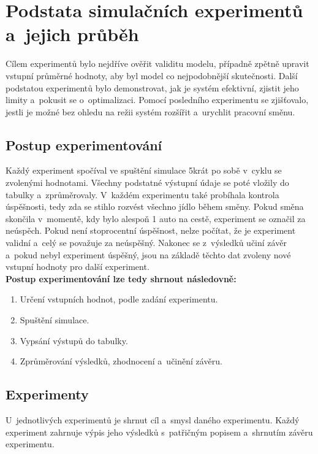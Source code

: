 \documentclass[a4paper, 11pt]{article}
\begin{document}
	\section{Podstata simulačních experimentů a~jejich průběh}

	Cílem experimentů bylo nejdříve ověřit validitu modelu, případně zpětně
	upravit vstupní průměrné hodnoty, aby byl model co nejpodobnější
	skutečnosti. Další podstatou experimentů bylo demonstrovat, jak je
	systém efektivní, zjistit jeho limity a~pokusit se o~optimalizaci.
	Pomocí posledního experimentu se zjišťovalo, jestli je možné bez ohledu
	na režii systém rozšířit a~urychlit pracovní směnu.


	\subsection{Postup experimentování}

	Každý experiment spočíval ve spuštění simulace 5krát po sobě v~cyklu se
	zvolenými hodnotami. Všechny podstatné výstupní údaje se poté vložily do
	tabulky a~zprůměrovaly. V~každém experimentu také probíhala kontrola
	úspěšnosti, tedy zda se stihlo rozvést všechno jídlo během směny. Pokud
	směna skončila v~momentě, kdy bylo alespoň 1 auto na cestě, experiment se
	označil za neúspěch. Pokud není stoprocentní úspěšnost, nelze počítat,
	že je experiment validní a~celý se považuje za neúspěšný. Nakonec se
	z~výsledků učiní závěr a~pokud nebyl experiment úspěšný, jsou na základě
	těchto dat zvoleny nové vstupní hodnoty pro další experiment. \\

	\textbf{Postup experimentování lze tedy shrnout následovně:}
	\begin{enumerate}
		\item Určení vstupních hodnot, podle zadání experimentu.
		\item Spuštění simulace.
		\item Vypsání výstupů do tabulky.
		\item Zprůměrování výsledků, zhodnocení a~učinění závěru.
	\end{enumerate}


	\subsection{Experimenty}
	\label{sectiion:experiments}

	U~jednotlivých experimentů je shrnut cíl a~smysl daného experimentu.
	Každý experiment zahrnuje výpis jeho výsledků s~patřičným popisem
	a~shrnutím závěru experimentu.
\end{document}
